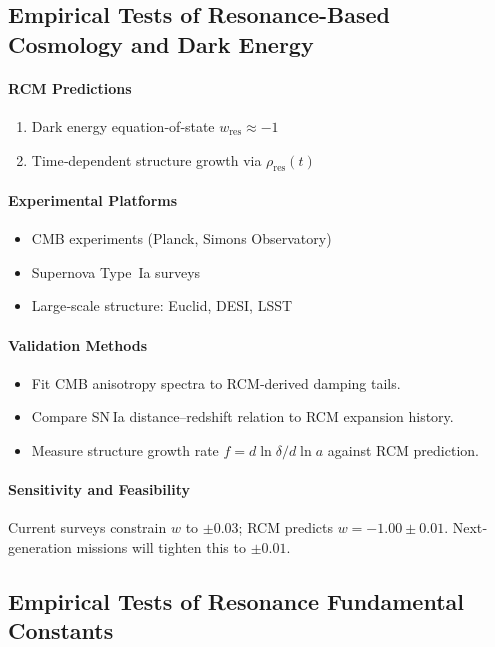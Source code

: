 \subsection{Empirical Tests of Resonance-Based Cosmology and Dark Energy}

\paragraph{RCM Predictions}
\begin{enumerate}
  \item Dark energy equation‐of‐state $w_{\mathrm{res}}\approx-1$\label{eq:w_res}
  \item Time‐dependent structure growth via $\rho_{\mathrm{res}}(t)$
\end{enumerate}

\paragraph{Experimental Platforms}
\begin{itemize}
  \item CMB experiments (Planck, Simons Observatory)  
  \item Supernova Type~Ia surveys  
  \item Large‐scale structure: Euclid, DESI, LSST
\end{itemize}

\paragraph{Validation Methods}
\begin{itemize}
  \item Fit CMB anisotropy spectra to RCM‐derived damping tails.  
  \item Compare SN Ia distance–redshift relation to RCM expansion history.  
  \item Measure structure growth rate $f=d\ln\delta/d\ln a$ against RCM prediction.
\end{itemize}

\paragraph{Sensitivity and Feasibility}
Current surveys constrain $w$ to $\pm0.03$; RCM predicts $w=-1.00\pm0.01$. Next‐generation missions will tighten this to $\pm0.01$.

\subsection{Empirical Tests of Resonance Fundamental Constants}

